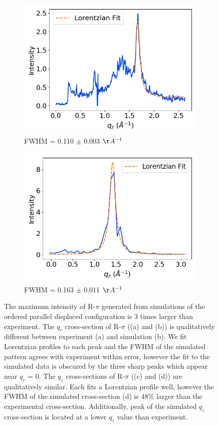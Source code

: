 \documentclass[journal=jpcbfk,manuscript=article]{achemso}
\begin{document}
\begin{figure}
\begin{subfigure}{0.45\textwidth}
  \includegraphics[width=\textwidth]{exp_zsection_fit.png}
  \caption{FWHM = 0.110 $\pm$ 0.003 $\AA^{-1}$}\label{fig:exp_zsection_fit}
  \end{subfigure}
  \begin{subfigure}{0.45\textwidth}
  \includegraphics[width=\textwidth]{sim_zsection_fit.png}
  \caption{FWHM = 0.163 $\pm$ 0.011 $\AA^{-1}$}\label{fig:sim_zsection_fit}
  \end{subfigure}
  \caption{
  The maximum intensity of R-$\pi$ generated from simulations of the ordered
  parallel displaced configuration is 3 times larger than experiment. The $q_r$
  cross-section of R-$\pi$ ((a) and (b)) is qualitatively different between 
  experiment (a) and simulation (b). We fit Lorentzian profiles to each peak and
  the FWHM of the simulated pattern agrees with experiment within error, however
  the fit to the simulated data is obscured by the three sharp peaks which appear
  near $q_r$ = 0. The $q_z$ cross-sections of R-$\pi$ ((c) and (d)) are 
  qualitatively similar. Each fits a Lorentzian profile well, however the FWHM
  of the simulated cross-section (d) is 48\% larger than the experimental 
  cross-section. Additionally, peak of the simulated $q_z$ cross-section is 
  located at a lower $q_z$ value than experiment.}\label{fig:rpi_exp_comparison}
  \end{figure}
  
\end{document}
